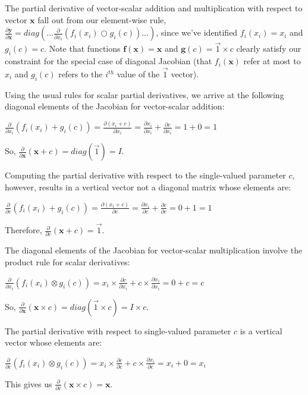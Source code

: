 \documentclass[11pt]{article}
\begin{document}
The partial derivative of vector-scalar addition and multiplication with respect to vector $\mathbf{x}$  fall out from our element-wise rule, $\frac{\partial \mathbf{y}}{\partial \mathbf{x}} = diag \left( \ldots \frac{\partial}{\partial x_i} ( f_i(x_i) \bigcirc g_i(c) ) \ldots \right)$, since we've identified $f_i(x_i) = x_i$ and $g_i(c) = c$. Note that functions $\mathbf{f(x)} = \mathbf{x}$ and $\mathbf{g}(c) = \vec{1} \times c$ clearly satisfy our constraint for the special case of diagonal Jacobian (that $f_i(\mathbf{x})$ refer at most to $x_i$ and $g_i(c)$ refers to the $i^{th}$ value of the $\vec{1}$ vector). 

Using the usual rules for scalar partial derivatives, we arrive at the following diagonal elements of the Jacobian for vector-scalar addition:
 
$\frac{\partial}{\partial x_i} ( f_i(x_i) + g_i(c) ) = \frac{\partial (x_i + c)}{\partial x_i} = \frac{\partial x_i}{\partial x_i} + \frac{\partial c}{\partial x_i} = 1 + 0 = 1$

So, $\frac{\partial}{\partial \mathbf{x}} ( \mathbf{x} + c ) = diag(\vec{1}) = I$.

Computing the partial derivative with respect to the single-valued parameter $c$, however, results in a vertical vector not a diagonal matrix whose elements are:
 
$\frac{\partial}{\partial c} ( f_i(x_i) + g_i(c) ) = \frac{\partial (x_i + c)}{\partial c} = \frac{\partial x_i}{\partial c} + \frac{\partial c}{\partial c} = 0 + 1 = 1$

Therefore, $\frac{\partial}{\partial c} ( \mathbf{x} + c ) = \vec{1}$.

The diagonal elements of the Jacobian for vector-scalar multiplication involve the product rule for scalar derivatives:

$\frac{\partial}{\partial x_i} ( f_i(x_i) \otimes g_i(c) ) = x_i \times \frac{\partial c}{\partial x_i} + c \times \frac{\partial x_i}{\partial x_i} = 0 + c = c$

So, $\frac{\partial}{\partial \mathbf{x}} ( \mathbf{x} \times c ) = diag(\vec{1} \times c) = I \times c$. 

The partial derivative with respect to single-valued parameter $c$ is a vertical vector whose elements are:

$\frac{\partial}{\partial c} ( f_i(x_i) \otimes g_i(c) ) = x_i \times \frac{\partial c}{\partial c} + c \times \frac{\partial x_i}{\partial c} = x_i + 0 = x_i$

This gives us $\frac{\partial}{\partial c} ( \mathbf{x} \times c ) = \mathbf{x}$.
\end{document}
